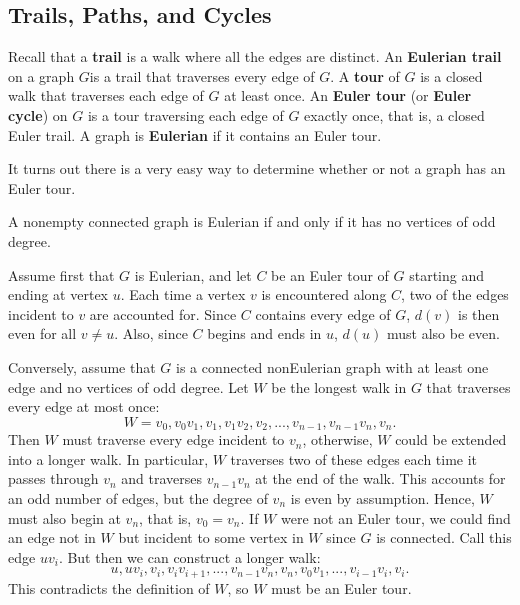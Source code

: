 \subsection{Trails, Paths, and Cycles}\label{sec:trails}
\begin{df}
Recall that a {\bf trail} is a walk where all the edges are
distinct. 
An {\bf Eulerian trail}  
on a graph $G$is a trail that traverses every edge of
$G$. A {\bf tour} of $G$ is a closed walk that
traverses each edge of $G$ at least once. An {\bf Euler tour} 
(or {\bf Euler cycle})  
on $G$ is a tour traversing each edge of $G$ exactly once, that is, a
closed Euler trail. 
A graph is {\bf Eulerian} if it contains an Euler tour.
\end{df}

It turns out there is a very easy way to determine whether or not a graph has an Euler tour.

\begin{thm}\label{thm:Eulerian}
A nonempty connected graph is Eulerian if and only if it has no
vertices of odd degree.
\begin{pf}
Assume first that $G$ is Eulerian, and let $C$ be an Euler tour of
$G$ starting and ending at vertex $u$. Each time a vertex $v$   is
encountered along $C$, two of the edges incident to $v$ are
accounted for. Since  $C$ contains every edge of $G$, $d(v)$ is
then even for all $v\neq u$. Also, since $C$ begins and ends in
$u$, $d(u)$ must also be even.

Conversely, assume that $G$ is a connected nonEulerian graph with
at least one edge and no vertices of odd degree. Let $W$ be the
longest walk in $G$ that traverses every edge at most once: $$W =
v_0, v_0v_1, v_1, v_1v_2, v_2, . . . , v_{n-1}, v_{n-1}v_n,
v_n.$$ Then $W$ must traverse every edge incident to $v_n$,
otherwise, $W$ could be extended into a longer walk. In
particular, $W$ traverses two of these edges each time it passes
through $v_n$ and traverses $v_{n-1}v_n$ at the end of the walk.
This accounts for an odd number of edges, but the degree of $v_n$
is even by assumption. Hence, $W$ must also begin at $v_n$, that
is, $v_0 = v_n$. If $W$ were not an Euler tour,  we could find an
edge not in $W$ but incident to some vertex in $W$ since $G$ is
connected. Call this edge $uv_i$. But then we can construct a
longer walk:
$$u, uv_i, v_i, v_iv_{i+1}, . . . , v_{n-1}v_n, v_n, v_0v_1, .
. . , v_{i-1}v_i, v_i.$$ This contradicts the definition of $W$,
so $W$ must be an Euler tour.
\end{pf}
\end{thm}


